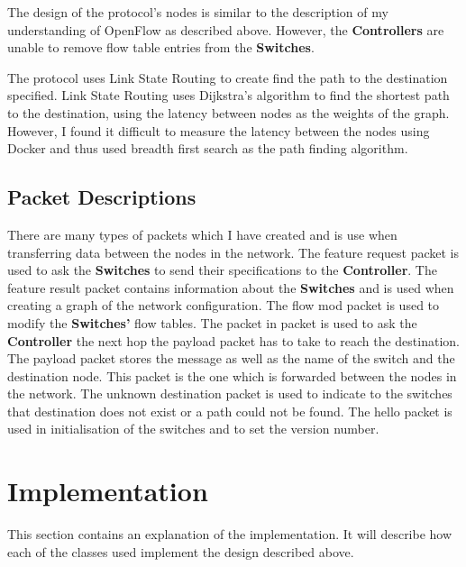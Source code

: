 \documentclass{article}
\begin{document}
The design of the protocol's nodes is similar to the description of my
understanding of OpenFlow as described above. However, the \textbf{Controllers}
are unable to remove flow table entries from the \textbf{Switches}.

The protocol uses Link State Routing to create find the path to the destination
specified. Link State Routing uses Dijkstra's algorithm to find the shortest
path to the destination, using the latency between nodes as the weights of the
graph. However, I found it difficult to measure the latency between the nodes
using Docker and thus used breadth first search as the path finding algorithm.

\subsection{Packet Descriptions}
There are many types of packets which I have created and is use when
transferring data between the nodes in the network. The feature request packet
is used to ask the \textbf{Switches} to send their specifications to the
\textbf{Controller}. The feature result packet contains information about the
\textbf{Switches} and is used when creating a graph of the network
configuration. The flow mod packet is used to modify the \textbf{Switches'}
flow tables. The packet in packet is used to ask the \textbf{Controller} the
next hop the payload packet has to take to reach the destination. The payload
packet stores the message as well as the name of the switch and the destination
node. This packet is the one which is forwarded between the nodes in the
network. The unknown destination packet is used to indicate to the switches
that destination does not exist or a path could not be found. The hello packet
is used in initialisation of the switches and to set the version number.

\section{Implementation}
This section contains an explanation of the implementation. It will describe how
each of the classes used implement the design described above.
\end{document}
